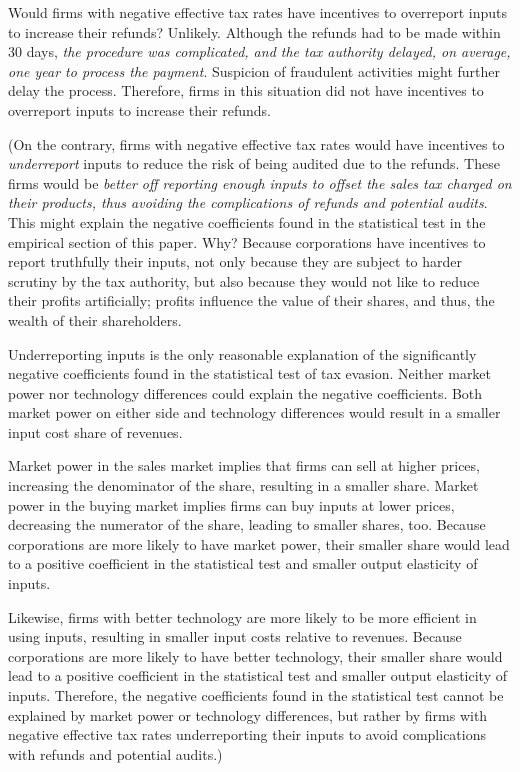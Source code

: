 \documentclass[
  12pt]{article}
\theoremstyle{definition}
\theoremstyle{remark}
\begin{document}
Would firms with negative effective tax rates have incentives to
overreport inputs to increase their refunds? Unlikely. Although the
refunds had to be made within 30 days, \emph{the procedure was
complicated, and the tax authority delayed, on average, one year to
process the payment}. Suspicion of fraudulent activities might further
delay the process. Therefore, firms in this situation did not have
incentives to overreport inputs to increase their refunds.

(On the contrary, firms with negative effective tax rates would have
incentives to \emph{underreport} inputs to reduce the risk of being
audited due to the refunds. These firms would be \emph{better off
reporting enough inputs to offset the sales tax charged on their
products, thus avoiding the complications of refunds and potential
audits}. This might explain the negative coefficients found in the
statistical test in the empirical section of this paper. Why? Because
corporations have incentives to report truthfully their inputs, not only
because they are subject to harder scrutiny by the tax authority, but
also because they would not like to reduce their profits artificially;
profits influence the value of their shares, and thus, the wealth of
their shareholders.

Underreporting inputs is the only reasonable explanation of the
significantly negative coefficients found in the statistical test of tax
evasion. Neither market power nor technology differences could explain
the negative coefficients. Both market power on either side and
technology differences would result in a smaller input cost share of
revenues.

Market power in the sales market implies that firms can sell at higher
prices, increasing the denominator of the share, resulting in a smaller
share. Market power in the buying market implies firms can buy inputs at
lower prices, decreasing the numerator of the share, leading to smaller
shares, too. Because corporations are more likely to have market power,
their smaller share would lead to a positive coefficient in the
statistical test and smaller output elasticity of inputs.

Likewise, firms with better technology are more likely to be more
efficient in using inputs, resulting in smaller input costs relative to
revenues. Because corporations are more likely to have better
technology, their smaller share would lead to a positive coefficient in
the statistical test and smaller output elasticity of inputs. Therefore,
the negative coefficients found in the statistical test cannot be
explained by market power or technology differences, but rather by firms
with negative effective tax rates underreporting their inputs to avoid
complications with refunds and potential audits.)
\end{document}
